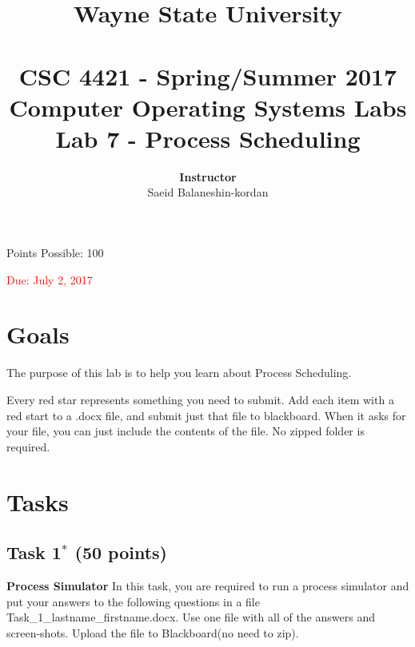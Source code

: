 \documentclass[16pt]{article}
\begin{document}
\title{\huge \textbf{Wayne State University \\
 \vline \\
\Huge CSC 4421 - Spring/Summer 2017 \\
 Computer Operating Systems Labs\\
 Lab 7 - Process Scheduling}\\
 \vline
 }
\author{\textbf{Instructor}  \vspace{0.2cm} \\ Saeid Balaneshin-kordan\\
}
\date{ }
\maketitle

\begin{center}
\Large Points Possible: 100

\textcolor{red}{Due: July 2, 2017}
\end{center}

\section*{Goals}

The purpose of this lab is to help you learn about Process Scheduling.

Every red star represents something you need to submit. Add each item with a red start to a .docx file, and submit just that file to blackboard. When it asks for your file, you can just include the contents of the file. No zipped folder is required.

\section*{Tasks}

\subsection*{Task 1$^*$ (50 points)}
\textbf{Process Simulator}
In this task, you are required to run a process simulator and put your answers to the following questions in a file Task\_1\_lastname\_firstname.docx. Use one file with all of the answers and screen-shots. Upload the file to Blackboard(no need to zip).
\end{document}
